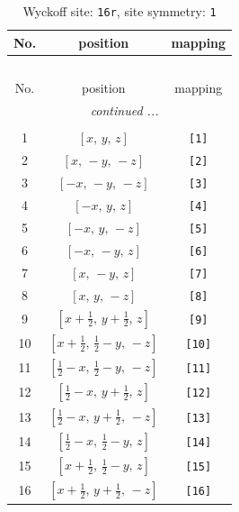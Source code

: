 \documentclass[fleqn,8pt]{jsarticle}
\begin{document}
\begin{longtable}{ccc}
\caption{Wyckoff site: {\tt 16r}, site symmetry: {\tt 1}}
 \\
 \hline \hline
No. & position & mapping \\ \hline \endfirsthead

\multicolumn{2}{l}{\tablename\ \thetable{}} \\
 \hline \hline
No. & position & mapping \\ \hline \endhead

 \hline \hline
\multicolumn{2}{r}{\footnotesize\it continued ...} \\ \endfoot

 \hline \hline
\multicolumn{2}{r}{} \\ \endlastfoot

1 & $\left[ x,\, y,\, z \right]$ & {\tt [1]} \\ \hline
2 & $\left[ x,\, - y,\, - z \right]$ & {\tt [2]} \\ \hline
3 & $\left[ - x,\, - y,\, - z \right]$ & {\tt [3]} \\ \hline
4 & $\left[ - x,\, y,\, z \right]$ & {\tt [4]} \\ \hline
5 & $\left[ - x,\, y,\, - z \right]$ & {\tt [5]} \\ \hline
6 & $\left[ - x,\, - y,\, z \right]$ & {\tt [6]} \\ \hline
7 & $\left[ x,\, - y,\, z \right]$ & {\tt [7]} \\ \hline
8 & $\left[ x,\, y,\, - z \right]$ & {\tt [8]} \\ \hline
9 & $\left[ x + \frac{1}{2},\, y + \frac{1}{2},\, z \right]$ & {\tt [9]} \\ \hline
10 & $\left[ x + \frac{1}{2},\, \frac{1}{2} - y,\, - z \right]$ & {\tt [10]} \\ \hline
11 & $\left[ \frac{1}{2} - x,\, \frac{1}{2} - y,\, - z \right]$ & {\tt [11]} \\ \hline
12 & $\left[ \frac{1}{2} - x,\, y + \frac{1}{2},\, z \right]$ & {\tt [12]} \\ \hline
13 & $\left[ \frac{1}{2} - x,\, y + \frac{1}{2},\, - z \right]$ & {\tt [13]} \\ \hline
14 & $\left[ \frac{1}{2} - x,\, \frac{1}{2} - y,\, z \right]$ & {\tt [14]} \\ \hline
15 & $\left[ x + \frac{1}{2},\, \frac{1}{2} - y,\, z \right]$ & {\tt [15]} \\ \hline
16 & $\left[ x + \frac{1}{2},\, y + \frac{1}{2},\, - z \right]$ & {\tt [16]} \\
\end{longtable}
\end{document}
